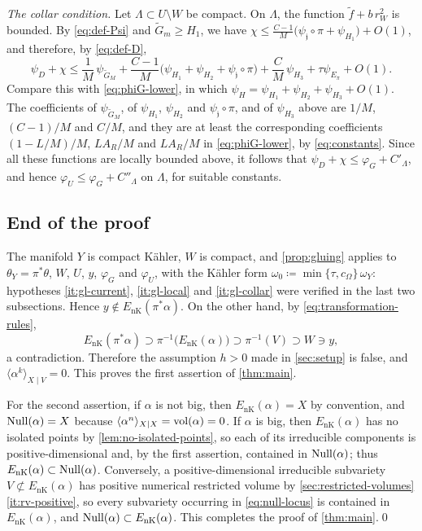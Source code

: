 \documentclass[11pt,a4paper]{amsart}
\newcommand{\EnK}{E_{\mathrm{nK}}}
\theoremstyle{definition}
\begin{document}
\emph{The collar condition.} Let $\Lambda\subset U\setminus W$ be
compact. On $\Lambda$, the function $\widetilde f+b\,r_W^2$ is bounded.
By \eqref{eq:def-Psi} and $\widetilde G_m\ge H_1$, we have
$\chi\le\frac{C-1}M\bigl(\psi_{\mathfrak j}\circ\pi+\psi_{H_1}\bigr)+O(1)$,
and therefore, by \eqref{eq:def-D},
\[
  \psi_D+\chi\le\frac1M\,\psi_{\widetilde G_M}
  +\frac{C-1}M\bigl(\psi_{H_1}+\psi_{H_2}+\psi_{\mathfrak j}\circ\pi\bigr)
  +\frac CM\,\psi_{H_3}+\tau\psi_{E_\pi}+O(1).
\]
Compare this with \eqref{eq:phiG-lower}, in which
$\psi_H=\psi_{H_1}+\psi_{H_2}+\psi_{H_3}+O(1)$. The coefficients of
$\psi_{\widetilde G_M}$, of $\psi_{H_1}$, $\psi_{H_2}$ and
$\psi_{\mathfrak j}\circ\pi$, and of $\psi_{H_3}$ above are $1/M$, $(C-1)/M$
and $C/M$, and they are at least the corresponding coefficients
$(1-L/M)/M$, $LA_R/M$ and $LA_R/M$ in \eqref{eq:phiG-lower}, by
\eqref{eq:constants}. Since all these functions are locally bounded above,
it follows that $\psi_D+\chi\le\varphi_G+C'_\Lambda$, and hence
$\varphi_U\le\varphi_G+C''_\Lambda$ on $\Lambda$, for suitable constants.

\subsection{End of the proof}\label{sec:conclusion}

The manifold $Y$ is compact K\"ahler, $W$ is compact, and
\cref{prop:gluing} applies to $\theta_Y=\pi^*\theta$, $W$, $U$, $y$,
$\varphi_G$ and $\varphi_U$, with the K\"ahler form
$\omega_0\coloneqq \min\{\tau,c_\Omega\}\,\omega_Y$: hypotheses
\ref{it:gl-current}, \ref{it:gl-local} and \ref{it:gl-collar} were
verified in the last two subsections. Hence $y\notin\EnK(\pi^*\alpha)$. On
the other hand, by \eqref{eq:transformation-rules},
\[
  \EnK(\pi^*\alpha)\supset\pi^{-1}\bigl(\EnK(\alpha)\bigr)
  \supset\pi^{-1}(V)\supset W\ni y,
\]
a contradiction. Therefore the assumption $h>0$ made in
\cref{sec:setup} is false, and $\langle\alpha^k\rangle_{X\mid V}=0$. This
proves the first assertion of \cref{thm:main}.

For the second assertion, if $\alpha$ is not big, then $\EnK(\alpha)=X$ by
convention, and $\operatorname{Null}(\alpha)=X$ because
$\langle\alpha^n\rangle_{X\mid X}=\operatorname{vol}(\alpha)=0$. If $\alpha$ is big,
then $\EnK(\alpha)$ has no isolated points by
\cref{lem:no-isolated-points}, so each of its irreducible components is
positive-dimensional and, by the first assertion, contained in
$\operatorname{Null}(\alpha)$; thus $\EnK(\alpha)\subset\Null(\alpha)$. Conversely, a
positive-dimensional irreducible subvariety $V\not\subset\EnK(\alpha)$ has
positive numerical restricted volume by
\cref{sec:restricted-volumes}\ref{it:rv-positive}, so every subvariety
occurring in \eqref{eq:null-locus} is contained in $\EnK(\alpha)$, and
$\Null(\alpha)\subset\EnK(\alpha)$. This completes the proof of
\cref{thm:main}.\qed
\end{document}
